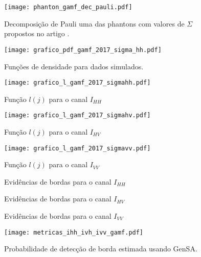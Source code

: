 \begin{figure}[hbt]
\centering
	\texttt{[image: phanton\_gamf\_dec\_pauli.pdf]}
	\caption{Decomposição de Pauli uma das phantons com valores de $\Sigma$ propostos no artigo \citep{gamf}.}\label{cap_acf_fig01}
\end{figure}
\begin{figure}[hbt]
	\centering
	\texttt{[image: grafico\_pdf\_gamf\_2017\_sigma\_hh.pdf]}
	\caption{Funções de densidade para dados simulados.}\label{cap_acf_fig02}
\end{figure}

\begin{figure}[hbt]
  \texttt{[image: grafico\_l\_gamf\_2017\_sigmahh.pdf]}
	\caption{Função $l(j)$ para o canal $I_{HH}$}\label{cap_acf_fig04}
\endminipage\hfill
{}
  \texttt{[image: grafico\_l\_gamf\_2017\_sigmahv.pdf]}
	\caption{Função $l(j)$ para o canal $I_{HV}$}\label{cap_acf_fig05}
\endminipage\hfill
\centering
{}
  \texttt{[image: grafico\_l\_gamf\_2017\_sigmavv.pdf]}
	\caption{Função $l(j)$ para o canal $I_{VV}$}\label{cap_acf_fig06}
\endminipage\hfill
\end{figure}
\begin{figure}[hbt]
\caption{Evidências de bordas para o canal $I_{HH}$}\label{cap_acf_fig07}
\endminipage\hfill
{}
\caption{Evidências de bordas para o canal $I_{HV}$}\label{cap_acf_fig08}
\endminipage\hfill
\centering
{}
\caption{Evidências de bordas para o canal $I_{VV}$}\label{cap_acf_fig09}
\endminipage\hfill
\end{figure}
%
\begin{figure}[hbt]
\centering
	\texttt{[image: metricas\_ihh\_ivh\_ivv\_gamf.pdf]}
	\caption{Probabilidade de detecção de borda estimada usando GenSA.}
\label{cap_acf_fig10}
\end{figure}
%
